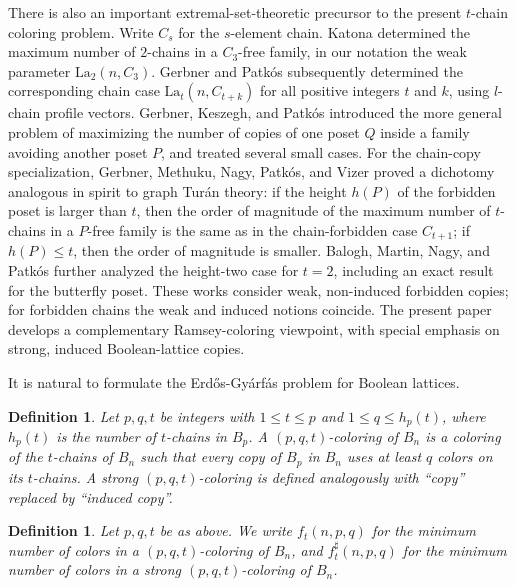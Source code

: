 \documentclass[twoside,12pt]{article}
\newtheorem{definition}[theorem]{Definition}
\newcommand{\LaT}{\mathrm{La}}
\begin{document}
There is also an important extremal-set-theoretic precursor to the present $t$-chain coloring problem.  Write $C_s$ for the $s$-element chain.  Katona \cite{Katona73} determined the maximum number of $2$-chains in a $C_3$-free family, in our notation the weak parameter $\LaT_2(n,C_3)$.  Gerbner and Patk\'{o}s \cite{GerbnerPatkos08} subsequently determined the corresponding chain case $\LaT_t(n,C_{t+k})$ for all positive integers $t$ and $k$, using $l$-chain profile vectors.  Gerbner, Keszegh, and Patk\'{o}s \cite{GerbnerKeszeghPatkos20} introduced the more general problem of maximizing the number of copies of one poset $Q$ inside a family avoiding another poset $P$, and treated several small cases.  For the chain-copy specialization, Gerbner, Methuku, Nagy, Patk\'{o}s, and Vizer \cite{GerbnerMethukuNagyPatkosVizer19} proved a dichotomy analogous in spirit to graph Tur\'{a}n theory: if the height $h(P)$ of the forbidden poset is larger than $t$, then the order of magnitude of the maximum number of $t$-chains in a $P$-free family is the same as in the chain-forbidden case $C_{t+1}$; if $h(P)\le t$, then the order of magnitude is smaller.  Balogh, Martin, Nagy, and Patk\'{o}s \cite{BaloghMartinNagyPatkos22} further analyzed the height-two case for $t=2$, including an exact result for the butterfly poset.  These works consider weak, non-induced forbidden copies; for forbidden chains the weak and induced notions coincide.  The present paper develops a complementary Ramsey-coloring viewpoint, with special emphasis on strong, induced Boolean-lattice copies.

It is natural to formulate the Erd\H{o}s-Gy\'{a}rf\'{a}s problem for Boolean lattices.

\begin{definition}\label{def:pqtcolor}
Let $p,q,t$ be integers with $1 \le t \le p$ and $1 \le q \le h_p(t)$, where $h_p(t)$ is the number of $t$-chains in $B_p$. A \emph{$(p,q,t)$-coloring} of $B_n$ is a coloring of the $t$-chains of $B_n$ such that every copy of $B_p$ in $B_n$ uses at least $q$ colors on its $t$-chains. A \emph{strong $(p,q,t)$-coloring} is defined analogously with ``copy'' replaced by ``induced copy''.
\end{definition}

\begin{definition}\label{def:ftnpq}
Let $p,q,t$ be as above. We write $f_t(n,p,q)$ for the minimum number of colors in a $(p,q,t)$-coloring of $B_n$, and $f_t^\sharp(n,p,q)$ for the minimum number of colors in a strong $(p,q,t)$-coloring of $B_n$.
\end{definition}
\end{document}
